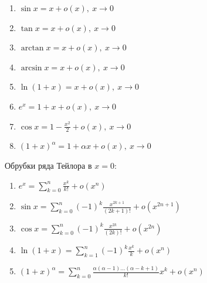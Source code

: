 \documentclass[14pt]{extarticle}
\numberwithin{equation}{section}
\begin{document}
\begin{itemize}
            \begin{enumerate}
                \item
                    \( \sin x = x + o(x), \ x \to 0 \)
                \item
                    \( \tan x = x + o(x), \ x \to 0 \)
                \item
                    \( \arctan x = x + o(x), \ x \to 0 \)
                \item
                    \( \arcsin x = x + o(x), \ x \to 0 \)
                \item
                    \( \ln (1 + x) = x + o(x), \ x \to 0 \)
                \item
                    \( e^x = 1 + x + o(x), \ x \to 0 \)
                \item
                    \( \cos x = 1 - \frac{x^2}{2} + o(x), \ x \to 0 \)
                \item
                    \( (1 + x)^\alpha = 1 + \alpha x + o(x), \ x \to 0 \)
            \end{enumerate}

            \newpage

            Обрубки ряда Тейлора в \( x = 0 \):
            \begin{enumerate}
                \item
                    \(
                        \displaystyle
                        e^x = \sum\limits_{k = 0}^n \frac{x^k}{k!} + o(x^n)
                    \)
                \item
                    \(
                        \displaystyle
                        \sin x = \sum\limits_{k = 0}^n (-1)^k \frac{x^{2k + 1}}{(2k + 1)!} + o(x^{2n + 1})
                    \)
                \item
                    \(
                        \displaystyle
                        \cos x = \sum\limits_{k = 0}^n (-1)^k \frac{x^{2k}}{(2k)!} + o(x^{2n})
                    \)
                \item
                    \(
                        \displaystyle
                        \ln (1 + x) = \sum\limits_{k = 1}^n (-1)^k \frac{x^k}{k} + o(x^n)
                    \)
                \item
                    \(
                        \displaystyle
                        (1 + x)^\alpha = \sum\limits_{k = 0}^n \frac{\alpha (\alpha - 1) \ldots (\alpha - k + 1)}{k!} x^k + o(x^n)
                    \)
            \end{enumerate}
    \end{itemize}
\end{document}
